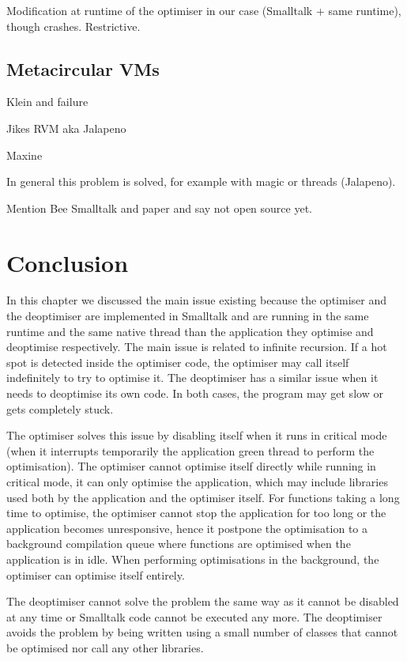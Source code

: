 \documentclass[a4paper,12pt,twoside]{../includes/ThesisStyle}
\begin{document}
Modification at runtime of the optimiser in our case (Smalltalk + same runtime), though crashes.
Restrictive.

\subsection{Metacircular VMs}

Klein and failure ~\cite{Unga05b}

Jikes RVM aka Jalapeno \cite{Alp99a}

Maxine ~\cite{Wimm13a}

In general this problem is solved, for example with magic or threads (Jalapeno).

Mention Bee Smalltalk and paper and say not open source yet.


\section{Conclusion}

In this chapter we discussed the main issue existing because the optimiser and the deoptimiser are implemented in Smalltalk and are running in the same runtime and the same native thread than the application they optimise and deoptimise respectively. The main issue is related to infinite recursion. If a hot spot is detected inside the optimiser code, the optimiser may call itself indefinitely to try to optimise it. The deoptimiser has a similar issue when it needs to deoptimise its own code. In both cases, the program may get slow or gets completely stuck.

The optimiser solves this issue by disabling itself when it runs in critical mode (when it interrupts temporarily the application green thread to perform the optimisation). The optimiser cannot optimise itself directly while running in critical mode, it can only optimise the  application, which may include libraries used both by the application and the optimiser itself. For functions taking a long time to optimise, the optimiser cannot stop the application for too long or the application becomes unresponsive, hence it postpone the optimisation to a background compilation queue where functions are optimised when the application is in idle. When performing optimisations in the background, the optimiser can optimise itself entirely.

The deoptimiser cannot solve the problem the same way as it cannot be disabled at any time or Smalltalk code cannot be executed any more. The deoptimiser avoids the problem by being written using a small number of classes that cannot be optimised nor call any other libraries.

\ifx\wholebook\relax\else
    
\end{document}
